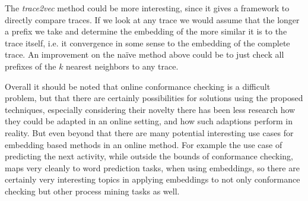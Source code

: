 \documentclass[runningheads]{template/llncs}
\begin{document}
The \emph{trace2vec} method could be more interesting, since it gives a framework to directly compare traces.
If we look at any trace we would assume that the longer a prefix we take and determine the embedding of the more similar it is to the trace itself, i.e. it convergence in some sense to the embedding of the complete trace.
An improvement on the naïve method above could be to just check all prefixes of the $k$ nearest neighbors to any trace.

Overall it should be noted that online conformance checking is a difficult problem, but that there are certainly possibilities for solutions using the proposed techniques, especially considering their novelty there has been less research how they could be adapted in an online setting, and how such adaptions perform in reality.
But even beyond that there are many potential interesting use cases for embedding based methods in an online method.
For example the use case of predicting the next activity, while outside the bounds of conformance checking, maps very cleanly to word prediction tasks, when using embeddings, so there are certainly very interesting topics in applying embeddings to not only conformance checking  but other process mining tasks as well.

%
%
%


%
\end{document}
